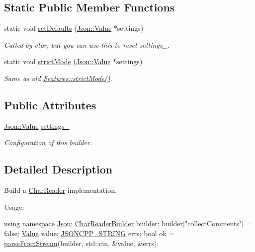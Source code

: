 \subsection*{Static Public Member Functions}
\begin{DoxyCompactItemize}
\item 
static void \hyperlink{classJson_1_1CharReaderBuilder_a03ff031e06aabff989ab4addc87294ab}{set\+Defaults} (\hyperlink{classJson_1_1Value}{Json\+::\+Value} $\ast$settings)
\begin{DoxyCompactList}\small\item\em Called by ctor, but you can use this to reset settings\+\_\+. \end{DoxyCompactList}\item 
static void \hyperlink{classJson_1_1CharReaderBuilder_a9c19e3c5475f9072d527810d4bf56749}{strict\+Mode} (\hyperlink{classJson_1_1Value}{Json\+::\+Value} $\ast$settings)
\begin{DoxyCompactList}\small\item\em Same as old \hyperlink{classJson_1_1Features_ae23176c14b2e79e81fb61fb1a8ab58ee}{Features\+::strict\+Mode()}. \end{DoxyCompactList}\end{DoxyCompactItemize}
\subsection*{Public Attributes}
\begin{DoxyCompactItemize}
\item 
\hyperlink{classJson_1_1Value}{Json\+::\+Value} \hyperlink{classJson_1_1CharReaderBuilder_ac69b7911ad64c171c51ebaf2ea26d958}{settings\+\_\+}
\begin{DoxyCompactList}\small\item\em Configuration of this builder. \end{DoxyCompactList}\end{DoxyCompactItemize}


\subsection{Detailed Description}
Build a \hyperlink{classJson_1_1CharReader}{Char\+Reader} implementation. 

Usage\+: 
\begin{DoxyCode}
\textcolor{keyword}{using namespace }\hyperlink{namespaceJson}{Json};
\hyperlink{classJson_1_1CharReaderBuilder}{CharReaderBuilder} builder;
builder[\textcolor{stringliteral}{"collectComments"}] = \textcolor{keyword}{false};
\hyperlink{classJson_1_1Value}{Value} value;
\hyperlink{json_8hpp_a1e723f95759de062585bc4a8fd3fa4be}{JSONCPP\_STRING} errs;
\textcolor{keywordtype}{bool} ok = \hyperlink{namespaceJson_a38f903cfdb57a6c4e86a7dcc42f3712c}{parseFromStream}(builder, std::cin, &value, &errs);
\end{DoxyCode}
 

